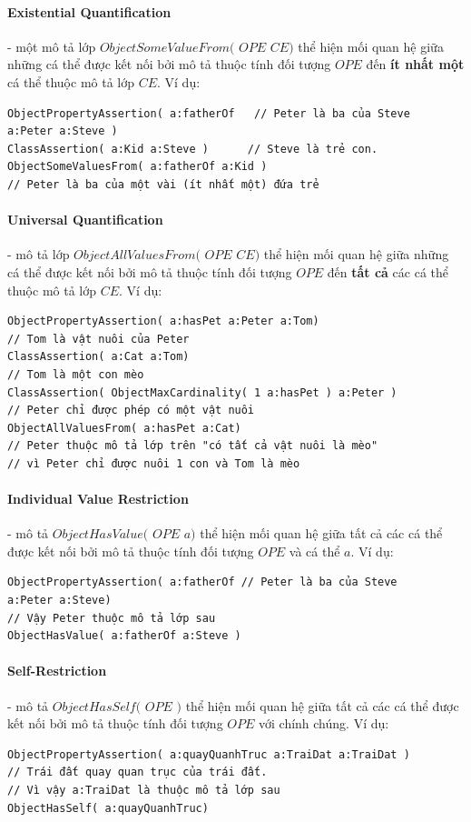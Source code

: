 \paragraph{Existential Quantification} - một mô tả lớp $ObjectSomeValueFrom($ $OPE$ $CE)$ thể hiện mối quan hệ giữa những cá thể được kết nối bởi mô tả thuộc tính đối tượng $OPE$ đến \textbf{ít nhất một} cá thể thuộc mô tả lớp $CE$. Ví dụ:
\begin{verbatim}
ObjectPropertyAssertion( a:fatherOf   // Peter là ba của Steve
a:Peter a:Steve )                     
ClassAssertion( a:Kid a:Steve )      // Steve là trẻ con.
ObjectSomeValuesFrom( a:fatherOf a:Kid ) 
// Peter là ba của một vài (ít nhất một) đứa trẻ
\end{verbatim} 

\paragraph{Universal Quantification} - mô tả lớp $ObjectAllValuesFrom($ $OPE$ $CE)$ thể hiện mối quan hệ giữa những cá thể được kết nối bởi mô tả thuộc tính đối tượng $OPE$ đến \textbf{tất cả} các cá thể thuộc mô tả lớp $CE$. Ví dụ: 
\begin{verbatim}
ObjectPropertyAssertion( a:hasPet a:Peter a:Tom)
// Tom là vật nuôi của Peter
ClassAssertion( a:Cat a:Tom) 
// Tom là một con mèo
ClassAssertion( ObjectMaxCardinality( 1 a:hasPet ) a:Peter )
// Peter chỉ được phép có một vật nuôi
ObjectAllValuesFrom( a:hasPet a:Cat)
// Peter thuộc mô tả lớp trên "có tất cả vật nuôi là mèo" 
// vì Peter chỉ được nuôi 1 con và Tom là mèo
\end{verbatim}

\paragraph{Individual Value Restriction} - mô tả  $ObjectHasValue($ $OPE$ $a)$ thể hiện mối quan hệ giữa tất cả các cá thể được kết nối bởi mô tả thuộc tính đối tượng $OPE$ và cá thể $a$. Ví dụ:
\begin{verbatim}
ObjectPropertyAssertion( a:fatherOf // Peter là ba của Steve
a:Peter a:Steve)
// Vậy Peter thuộc mô tả lớp sau
ObjectHasValue( a:fatherOf a:Steve )
\end{verbatim}

\paragraph{Self-Restriction} - mô tả $ObjectHasSelf($ $OPE$ $)$ thể hiện mối quan hệ giữa tất cả các cá thể được kết nối bởi mô tả thuộc tính đối tượng $OPE$ với chính chúng. Ví dụ:
\begin{verbatim}
ObjectPropertyAssertion( a:quayQuanhTruc a:TraiDat a:TraiDat )	
// Trái đất quay quan trục của trái đất.
// Vì vậy a:TraiDat là thuộc mô tả lớp sau
ObjectHasSelf( a:quayQuanhTruc)
\end{verbatim}

